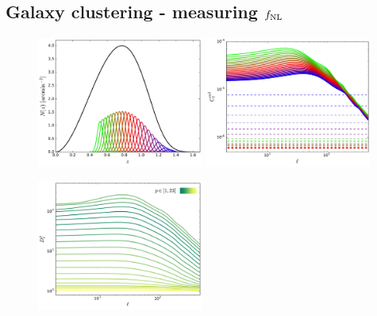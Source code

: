 \documentclass[twocolumn,amsfont,amssymb,amsmath, showpacs,balancelastpage, nofootinbib]{revtex4-1}
\begin{document}
  \subsection{Galaxy clustering - measuring $f_{\rm NL}$}\label{ssec:results.fnl}
    \begin{figure}
      \centering
      \includegraphics[width=0.49\textwidth]{Figs/nz_lsst_gc}
      \includegraphics[width=0.49\textwidth]{Figs/c_ij_gc}
      \caption{}\label{fig:nz_gc}
    \end{figure}
    \begin{figure}
      \centering
      \includegraphics[width=0.49\textwidth]{Figs/d_p_gc}
      \caption{}\label{fig:dp_gc}
    \end{figure}
\end{document}
